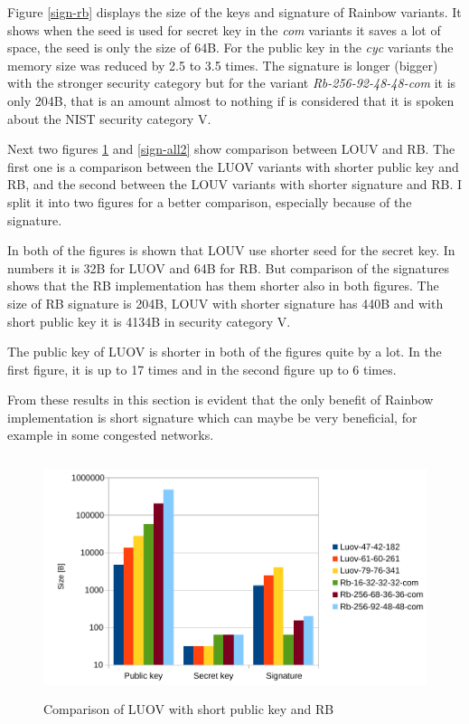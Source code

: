 \documentclass[thesis=M,english]{FITthesis}[2019/12/23]
\begin{document}
\noindent
Figure \ref{sign-rb} displays the size of the keys and signature of Rainbow variants. It shows when the seed is used for secret key in the \textit{com} variants it saves a lot of space, the seed is only the size of 64B. For the public key in the \textit{cyc} variants the memory size was reduced by 2.5 to 3.5 times. The signature is longer (bigger) with the stronger security category but for the variant \textit{Rb-256-92-48-48-com} it is only 204B, that is an amount almost to nothing if is considered that it is spoken about the NIST security category V.

\bigskip
\noindent
Next two figures \ref{sign-all1} and \ref{sign-all2} show comparison between LOUV and RB. The first one is a comparison between the LUOV variants with shorter public key and RB, and the second between the LOUV variants with shorter signature and RB. I split it into two figures for a better comparison, especially because of the signature.

\bigskip
\noindent
In both of the figures is shown that LOUV use shorter seed for the secret key. In numbers it is 32B for LUOV and 64B for RB. But comparison of the signatures shows that the RB implementation has them shorter also in both figures. The size of RB signature is 204B, LOUV with shorter signature has 440B and with short public key it is 4134B in security category V.

\bigskip
\noindent
The public key of LUOV is shorter in both of the figures quite by a lot. In the first figure, it is up to 17 times and in the second figure up to 6 times.

\bigskip
\noindent
From these results in this section is evident that the only benefit of Rainbow implementation is short signature which can maybe be very beneficial, for example in some congested networks.

\begin{figure}[H]
\centering
\includegraphics[width=13cm,height=7cm]{images/mem-sign-all1.pdf}
\caption{Comparison of LUOV with short public key and RB}
\label{sign-all1}
\end{figure}
\end{document}
